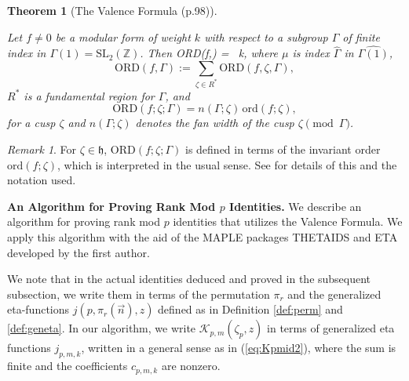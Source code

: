 \documentclass[12pt]{amsart}
\newtheorem{theorem}{Theorem}[section]
\theoremstyle{definition}
\theoremstyle{remark}
\newtheorem*{remark}{Remark}
\numberwithin{equation}{section}
\newcommand{\SL}{\mbox{SL}}
\newcommand\ord{\mbox{ord}}
\newcommand\ORD{\mbox{ORD}}
\newcommand\eqn[1]{(\ref{eq:#1})}
\newcommand\refdef[1]{\ref{def:#1}}
\begin{document}
\begin{theorem}[The Valence Formula \cite{Ra} (p.98)]
\label{thm:val}

Let $f\ne0$ be a modular form of weight $k$ with respect to a subgroup $\Gamma$ of finite index
in $\Gamma(1)=\SL_2(\mathbb{Z})$. Then
\beq
\ORD(f,\Gamma) =  \mu \, k,
\label{eq:valform}
\eeq
where $\mu$ is index $\widehat{\Gamma}$ in $\widehat{\Gamma(1)}$,
$$
\ORD(f,\Gamma) := \sum_{\zeta\in R^{*}} \ORD(f,\zeta,\Gamma),
$$
$R^{*}$ is a fundamental region for $\Gamma$,
and
\begin{equation}
\label{eq:ORDdef}
\ORD(f;\zeta;\Gamma) = n(\Gamma;\zeta)\, \ord(f;\zeta),
\end{equation}
for a cusp $\zeta$ and
$n(\Gamma;\zeta)$ denotes the fan width of the cusp $\zeta \pmod{\Gamma}$.
\end{theorem}
\begin{remark}
For $\zeta\in\mathfrak{h}$,
$\ORD(f;\zeta;\Gamma)$ is defined in terms of 
 the invariant order $\ord(f;\zeta)$, which  is interpreted
in the usual sense. See \cite[p.91]{Ra} for details of this and the 
notation used.
\end{remark}

\noindent
{\bf An Algorithm for Proving Rank Mod $p$ Identities.}
We describe an algorithm for proving rank mod $p$ identities that utilizes the
Valence Formula. We apply this algorithm
with the aid of the MAPLE packages THETAIDS and ETA developed by the first author.

We note that in the actual identities deduced and proved in the subsequent subsection, we write them in terms of the permutation $\pi_r$ and the generalized eta-functions $j(p,\pi_r(\overrightarrow{n}),z)$ defined as in Definition \refdef{perm} and \refdef{geneta}. In our algorithm, we write $\mathcal{K}_{p,m}(\zeta_{p},z)$ in terms of generalized eta functions $j_{p,m,k}$, written in a general sense as in \eqn{Kpmid2}, where the sum is finite and the coefficients $c_{p,m,k}$ are nonzero.  
\end{document}
